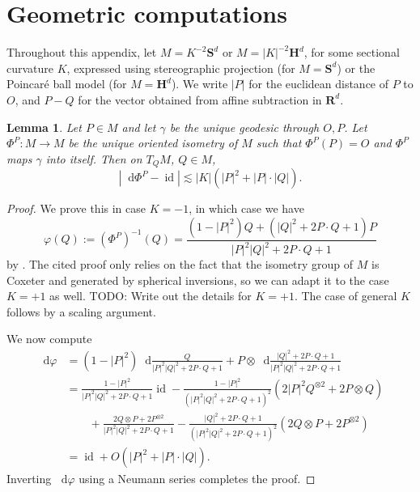 \documentclass[reqno,10pt]{amsart}
\newcommand{\ZZ}{\mathbf{Z}}
\newcommand{\RR}{\mathbf{R}}
\newcommand{\Hyp}{\mathbf H}
\newcommand{\Sph}{\mathbf S}
\DeclareMathOperator{\id}{id}
\newcommand*\dif{\mathop{}\!\mathrm{d}}
\newtheorem{lemma}[theorem]{Lemma}
\newtheorem{proposition}[theorem]{Proposition}
\theoremstyle{definition}
\numberwithin{equation}{section}
\begin{document}



\appendix 
\section{Geometric computations}\label{geometric computations}
Throughout this appendix, let $M = K^{-2}\Sph^d$ or $M = |K|^{-2}\Hyp^d$, for some sectional curvature $K$, expressed using stereographic projection (for $M = \Sph^d$) or the Poincar\'e ball model (for $M = \Hyp^d$).
We write $|P|$ for the euclidean distance of $P$ to $O$, and $P - Q$ for the vector obtained from affine subtraction in $\RR^d$.

\begin{lemma}\label{Coxeter estimate}
Let $P \in M$ and let $\gamma$ be the unique geodesic through $O, P$.
Let $\Phi^P: M \to M$ be the unique oriented isometry of $M$ such that $\Phi^P(P) = O$ and $\Phi^P$ maps $\gamma$ into itself.
Then on $T_QM$, $Q \in M$,
$$|\dif \Phi^P - \id| \lesssim |K|(|P|^2 + |P| \cdot |Q|).$$
\end{lemma}
\begin{proof}
We prove this in case $K = -1$, in which case we have 
$$\varphi(Q) := (\Phi^P)^{-1}(Q) = \frac{(1 - |P|^2)Q + (|Q|^2 + 2P \cdot Q + 1)P}{|P|^2 |Q|^2 + 2P \cdot Q + 1}$$
by \cite[(4.5.5)]{ratcliffe2006foundations}.
The cited proof only relies on the fact that the isometry group of $M$ is Coxeter and generated by spherical inversions, so we can adapt it to the case $K = +1$ as well. TODO: Write out the details for $K = +1$.
The case of general $K$ follows by a scaling argument.

We now compute 
\begin{align*}
\dif \varphi &= (1 - |P|^2) \dif \frac{Q}{|P|^2|Q|^2 + 2P \cdot Q + 1} + P \otimes \dif \frac{|Q|^2 + 2P \cdot Q + 1}{|P|^2 |Q|^2 + 2P\cdot Q + 1} \\
&= \frac{1 - |P|^2}{|P|^2 |Q|^2 + 2 P \cdot Q + 1} \id - \frac{1 - |P|^2}{(|P|^2 |Q|^2 + 2P \cdot Q + 1)^2}(2|P|^2Q^{\otimes 2} + 2P \otimes Q) \\
&\qquad + \frac{2Q \otimes P + 2P^{\otimes 2}}{|P|^2 |Q|^2 + 2P \cdot Q + 1} - \frac{|Q|^2 + 2P \cdot Q + 1}{(|P|^2 |Q|^2 + 2P \cdot Q + 1)^2} (2Q \otimes P + 2P^{\otimes 2}) \\
&= \id + O(|P|^2 + |P| \cdot |Q|). 
\end{align*}
Inverting $\dif \varphi$ using a Neumann series completes the proof.
\end{proof}
\end{document}
